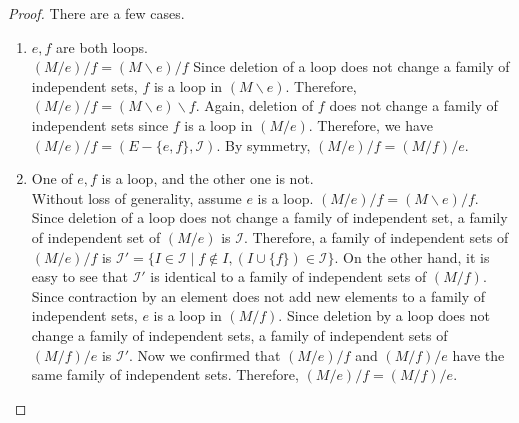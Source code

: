 \begin{proof}
There are a few cases.
\begin{enumerate}

\item $e, f$ are both loops. \\
$(M / e) / f = (M \backslash e) / f$
Since deletion of a loop does not change a family of independent sets, $f$ is a loop in $(M \backslash e)$.
Therefore, $(M / e) / f = (M \backslash e) \backslash f$.
Again, deletion of $f$ does not change a family of independent sets since $f$ is a loop in $(M / e)$.
Therefore, we have $(M / e) / f = (E - \{ e, f \}, \mathcal{I})$.
By symmetry, $(M / e) / f = (M / f) / e$.

\item 
One of $e, f$ is a loop, and the other one is not. \\
Without loss of generality, assume $e$ is a loop.
$(M / e) / f = (M \backslash e) / f$.
Since deletion of a loop does not change a family of independent set, a family of independent set of $(M / e)$ is $\mathcal{I}$.
Therefore, a family of independent sets of $(M / e) / f$ is $\mathcal{I}' = \{ I \in \mathcal{I} \mid f \notin I, (I \cup \{ f \}) \in \mathcal{I} \}$.
On the other hand, it is easy to see that $\mathcal{I}'$ is identical to a family of independent sets of $(M / f)$.
Since contraction by an element does not add new elements to a family of independent sets, $e$ is a loop in $(M / f)$.
Since deletion by a loop does not change a family of independent sets, a family of independent sets of $(M / f) / e$ is $\mathcal{I}'$.
Now we confirmed that $(M / e) / f$ and $(M / f) / e$ have the same family of independent sets.
Therefore, $(M / e) / f = (M / f) / e$.


\end{enumerate}
\end{proof}
